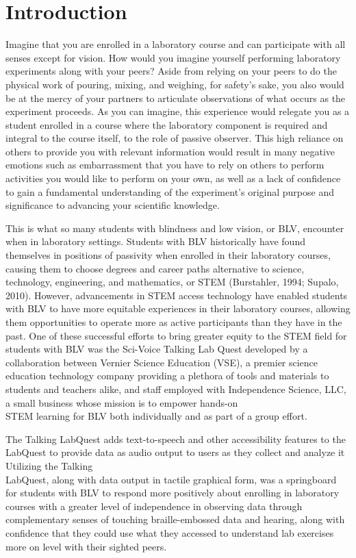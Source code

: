 \documentclass[11.5pt]{sig-alternate}
\begin{document}
\section*{Introduction}
\begin{large}
Imagine that you are enrolled in a laboratory course and can participate with all senses except for vision. How would you imagine yourself performing laboratory experiments along with your peers? Aside from relying on your peers to do the physical work of pouring, mixing, and weighing, for safety’s sake, you also would be at the mercy of your partners to articulate observations of what occurs as the experiment proceeds. As you can imagine, this experience would relegate you as a student enrolled in a course where the laboratory component is required and integral to the course itself, to the role of passive observer. This high reliance on others to provide you with relevant information would result in many negative emotions such as embarrassment that you have to rely on others to perform activities you would like to perform on your own, as well as a lack of confidence to gain a fundamental understanding of the experiment’s original purpose and significance to advancing your scientific knowledge.

This is what so many students with blindness and low vision, or BLV, encounter when in laboratory settings. Students with BLV historically have found themselves in positions of passivity when enrolled in their laboratory courses, causing them to choose degrees and career paths alternative to science, technology, engineering, and mathematics, or STEM (Burstahler, 1994; Supalo, 2010). However, advancements in STEM access technology have enabled students with BLV to have more equitable experiences in their laboratory courses, allowing them opportunities to operate more as active participants than they have in the past. One of these successful efforts to bring greater equity to the STEM field for students with BLV was the Sci-Voice Talking Lab Quest developed by a collaboration between Vernier Science Education (VSE), a premier science education technology company providing a plethora of tools and materials to students and teachers alike, and staff employed with Independence Science, LLC, a small business whose mission is to empower hands-on \\STEM learning for BLV both individually and as part of a group effort.

The Talking LabQuest adds text-to-speech and other accessibility features to the LabQuest to provide data as audio output to users as they collect and analyze it Utilizing the Talking \\LabQuest, along with data output in tactile graphical form, was a springboard for students with BLV to respond more positively about enrolling in laboratory courses with a greater level of independence in observing data through complementary senses of touching braille-embossed data and hearing, along with confidence that they could use what they accessed to understand lab exercises more on level with their sighted peers.


\end{large}
\end{document}
